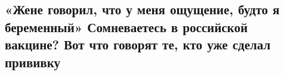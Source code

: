  
 
 
 
 
 
\subsection{«Жене говорил, что у меня ощущение, будто я беременный» Сомневаетесь в российской вакцине? Вот что говорят те, кто уже сделал прививку}
\label{sec:22_12_2020.news.ru.meduza_io.1.privivka_sputnik_v}

